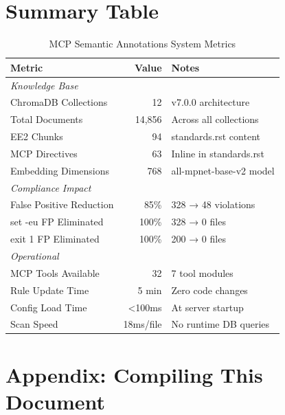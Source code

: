 \documentclass[11pt]{article}
\begin{document}
\newpage
\section{Summary Table}

\begin{table}[H]
\centering
\caption{MCP Semantic Annotations System Metrics}
\label{tab:metrics}
\begin{tabular}{@{}lrl@{}}
\toprule
\textbf{Metric} & \textbf{Value} & \textbf{Notes} \\
\midrule
\multicolumn{3}{l}{\textit{Knowledge Base}} \\
ChromaDB Collections & 12 & v7.0.0 architecture \\
Total Documents & 14,856 & Across all collections \\
EE2 Chunks & 94 & standards.rst content \\
MCP Directives & 63 & Inline in standards.rst \\
Embedding Dimensions & 768 & all-mpnet-base-v2 model \\
\midrule
\multicolumn{3}{l}{\textit{Compliance Impact}} \\
False Positive Reduction & 85\% & 328 → 48 violations \\
set -eu FP Eliminated & 100\% & 328 → 0 files \\
exit 1 FP Eliminated & 100\% & 200 → 0 files \\
\midrule
\multicolumn{3}{l}{\textit{Operational}} \\
MCP Tools Available & 32 & 7 tool modules \\
Rule Update Time & 5 min & Zero code changes \\
Config Load Time & <100ms & At server startup \\
Scan Speed & 18ms/file & No runtime DB queries \\
\bottomrule
\end{tabular}
\end{table}

\section{Appendix: Compiling This Document}
\end{document}
